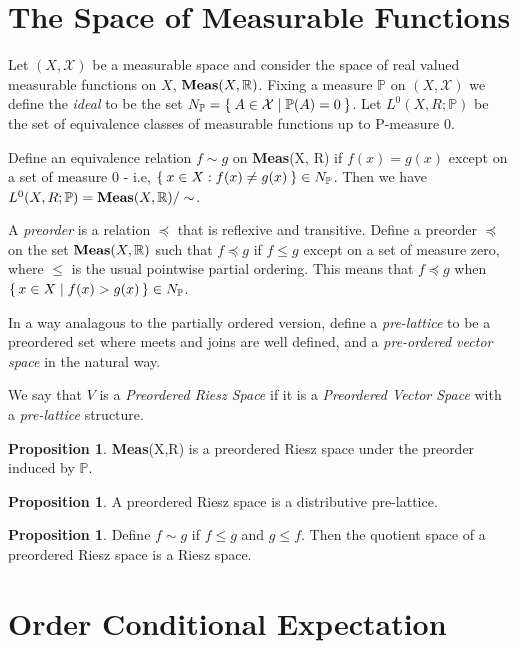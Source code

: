 \documentclass[letterpaper,10pt,oneside,onecolumn,reqno]{amsart}
\renewcommand{\P}{\mathbb P}
\newcommand{\R}{\mathbb R}
\newcommand{\X}{\mathcal X}
\theoremstyle{definition}
\newtheorem{pro}[thm]{Proposition}
\newcommand{\catname}[1]{{\normalfont\textbf{#1}}}
\newcommand{\Meas}{\catname{Meas}}
\begin{document}
\section{The Space of Measurable Functions}

Let $(X, \X)$ be a measurable space and consider the space of real
valued measurable functions on $X$, $\Meas(X,\R)$. Fixing a measure
$\P$ on $(X, \X)$ we define the \emph{ideal} to be the set
$N_\P = \Set{A \in \X | \P(A) = 0}$. Let $L^0(X,R;\P)$ be the set of
equivalence classes of measurable functions up to \P-measure 0. 

Define an equivalence relation $f \sim g$ on \Meas(X, \R) if $f(x) =
g(x)$ except on a set of measure 0 - i.e, $\Set{x \in X : f(x) \neq
g(x)} \in N_\P$. Then we have $L^0(X,R;\P) = \Meas(X,\R) / \sim$. 

A \emph{preorder} is a relation $\preceq $ that is reflexive and
transitive. Define a preorder $\preceq $ on the set $\Meas(X,\R)$ such
that $f \preceq g$ if $f \leq g$ except on a set of measure zero,
where $\leq $ is the usual pointwise partial ordering. This means that
$f \preceq g$ when $\set{x \in X | f(x) > g(x)} \in N_\P$. 

In a way analagous to the partially ordered version, define a
\emph{pre-lattice} to be a preordered set where meets and joins are
well defined, and a \emph{pre-ordered vector space} in the natural way.

We say that $V$ is a \emph{Preordered Riesz Space} if it is a
\emph{Preordered Vector Space} with a \emph{pre-lattice} structure. 

\begin{pro}
\Meas(X,\R) is a preordered Riesz space under the preorder induced by
$\P$.
\end{pro}

\begin{pro}
A preordered Riesz space is a distributive pre-lattice.
\end{pro}

\begin{pro}
Define $f \sim g$ if $f \leq g$ and $g \leq f$. Then the quotient
space of a preordered Riesz space is a Riesz space.
\end{pro}

\section{Order Conditional Expectation}
\label{sec:order-cond-expect}
\end{document}
